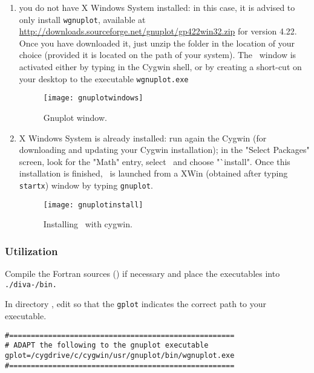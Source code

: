 \begin{enumerate}

\item you do not have X Windows System installed: in this case, it is advised to only install \texttt{wgnuplot}, available at\\
\url{http://downloads.sourceforge.net/gnuplot/gp422win32.zip} for version 4.22.\\
Once you have downloaded it, just unzip the folder in the location of your choice (provided it is located on the path of your system). The \gnuplot\, window is activated either by typing  in the Cygwin shell, or by creating a short-cut on your desktop to the executable \texttt{wgnuplot.exe}


\begin{figure}[htpb]
\centering
\parbox{.6\textwidth}{
\texttt{[image: gnuplotwindows]}
}\parbox{.4\textwidth}{
\caption{Gnuplot window.\label{fig:gnuplotwindows}}
}
\end{figure}

\item X Windows System is already installed: run again the Cygwin  (for downloading and updating your Cygwin installation); in the "Select Packages" screen, look for the "Math" entry, select \gnuplot\, and choose "`install". Once this installation is finished, \gnuplot\, is launched from a XWin (obtained after typing \texttt{startx}) window by typing \texttt{gnuplot}.

\begin{figure}[htpb]
\centering
\parbox{.7\textwidth}{
\texttt{[image: gnuplotinstall]}
}\parbox{.3\textwidth}{
\caption{Installing \gnuplot\, with cygwin.\label{fig:gnuplotinstall}}
}
\end{figure}

\end{enumerate} 


\subsubsection{Utilization}

Compile the Fortran sources () if necessary and place the executables into \texttt{./diva-\divaversion/bin.}

In directory , edit  so that the \texttt{gplot} indicates the correct path to your \gnuplot\, executable.
\example\\
\begin{verbatim}
#====================================================
# ADAPT the following to the gnuplot executable
gplot=/cygdrive/c/cygwin/usr/gnuplot/bin/wgnuplot.exe
#====================================================
\end{verbatim}

